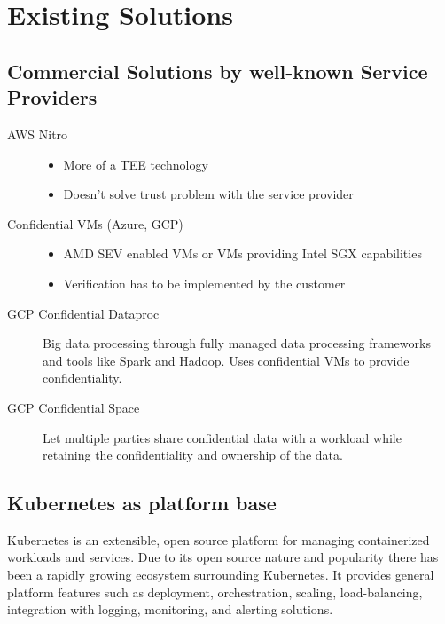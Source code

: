 \section{Existing Solutions}

\subsection{Commercial Solutions by well-known Service Providers}

\begin{description}
  \item[AWS Nitro]
    \begin{itemize}
      \item More of a TEE technology
      \item Doesn't solve trust problem with the service provider
    \end{itemize}
  \item[Confidential VMs (Azure, GCP)]
    \begin{itemize}
      \item AMD SEV enabled VMs or VMs providing Intel SGX capabilities
      \item Verification has to be implemented by the customer
    \end{itemize}
  \item[GCP Confidential Dataproc]
    Big data processing through fully managed data processing frameworks and
    tools like Spark and Hadoop. Uses confidential VMs to provide
    confidentiality.
  \item[GCP Confidential Space]
    Let multiple parties share confidential data with a workload while retaining
    the confidentiality and ownership of the data.
\end{description}


\subsection{Kubernetes as platform base}

Kubernetes is an extensible, open source platform for managing containerized
workloads and services. Due to its open source nature and popularity there has
been a rapidly growing ecosystem surrounding Kubernetes. It provides general
platform features such as deployment, orchestration, scaling, load-balancing,
integration with logging, monitoring, and alerting solutions.


